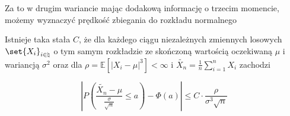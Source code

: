 Za to w drugim wariancie mając dodakową informację o trzecim momencie, możemy wyznaczyć prędkość zbiegania do rozkładu normalnego
\begin{theorem}
	Istnieje taka stała \(C\), że dla każdego ciągu niezależnych zmiennych losowych \(\set{X_i}_{i \in \natural}\) o tym samym rozkładzie ze skończoną wartością oczekiwaną \(\mu\) i wariancją \(\sigma^2\) oraz dla \(\rho = \mathbb{E}\left[ \left|X_i-\mu\right|^3 \right] < \infty \) i \(\widetilde{X_n} = \frac{1}{n} \sum_{i=1}^{n} X_i\) zachodzi
	
	\[ 
		\left|P\left( \frac{\widetilde{X_n}-\mu}{\frac{\sigma}{\sqrt{n} }} \le a \right) - \Phi\left( a  \right) \right| \le C\cdot \frac{\rho}{\sigma^3 \sqrt{n} }
	\]
\end{theorem}
